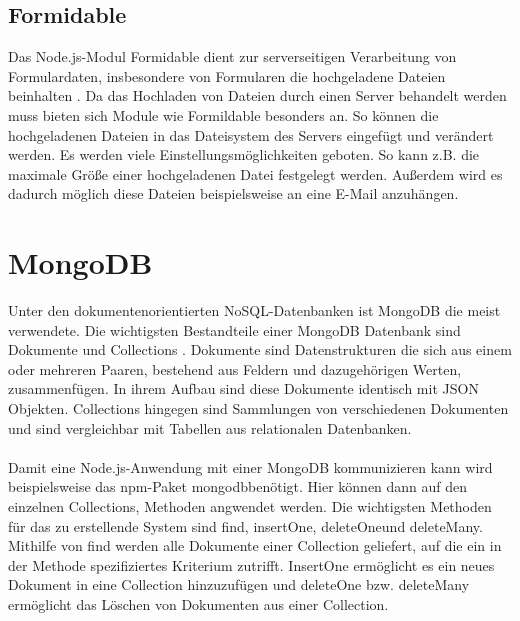\subsection{Formidable}
Das Node.js-Modul Formidable dient zur serverseitigen Verarbeitung von Formulardaten, insbesondere von Formularen die hochgeladene Dateien beinhalten \cite{formidable:listing}. Da das Hochladen von Dateien durch einen Server behandelt werden muss bieten sich Module wie Formildable besonders an. So können die hochgeladenen Dateien in das Dateisystem des Servers eingefügt und verändert werden. Es werden viele Einstellungsmöglichkeiten geboten. So kann z.B. die maximale Größe einer hochgeladenen Datei festgelegt werden. Außerdem wird es dadurch möglich diese Dateien beispielsweise an eine E-Mail anzuhängen.

\section{MongoDB}
Unter den dokumentenorientierten NoSQL-Datenbanken ist MongoDB die meist verwendete. Die wichtigsten Bestandteile einer MongoDB Datenbank sind Dokumente und Collections \cite{mongodb:listing}. Dokumente sind Datenstrukturen die sich aus einem oder mehreren Paaren, bestehend aus Feldern und dazugehörigen Werten, zusammenfügen. In ihrem Aufbau sind diese Dokumente identisch mit JSON Objekten. Collections hingegen sind Sammlungen von verschiedenen Dokumenten und sind vergleichbar mit Tabellen aus relationalen Datenbanken.
\\
\\
Damit eine Node.js-Anwendung mit einer MongoDB kommunizieren kann wird beispielsweise das \glqq npm\grqq-Paket \glqq mongodb\grqq benötigt. Hier können dann auf den einzelnen Collections, Methoden angwendet werden. Die wichtigsten Methoden für das zu erstellende System sind \glqq find\grqq , \glqq insertOne\grqq , \glqq deleteOne\grqq und \glqq deleteMany\grqq. Mithilfe von find werden alle Dokumente einer Collection geliefert, auf die ein in der Methode spezifiziertes Kriterium zutrifft. InsertOne ermöglicht es ein neues Dokument in eine Collection hinzuzufügen und deleteOne bzw. deleteMany ermöglicht das Löschen von Dokumenten aus einer Collection.
